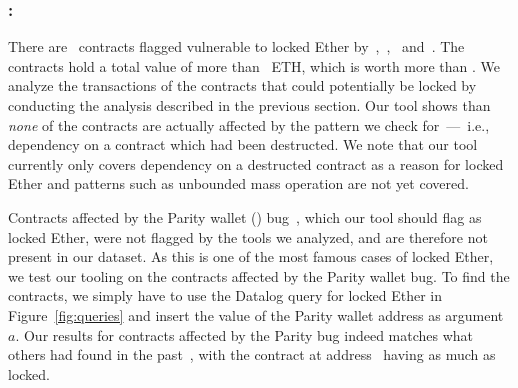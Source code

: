% 

\subsubsection{\vle: \lockedether}
\label{ssec:analysis-le}
There are~ contracts flagged vulnerable to locked Ether by~\cite{Tsankov2018},~\cite{Grech2018},~\cite{Nikolic2018a} and~\cite{DBLP:conf/ndss/KalraGDS18}. The contracts hold a total value of more than~ ETH, which is worth more than . We analyze the transactions of the contracts that could potentially be locked by conducting the analysis described in the previous section. Our tool shows than \emph{none} of the contracts are actually affected by the pattern we check for~---~i.e., dependency on a contract which had been destructed.
We note that our tool currently only covers dependency on a destructed contract as a reason for locked Ether and patterns such as unbounded mass operation are not yet covered.

Contracts affected by the Parity wallet () bug~\cite{Breidenbach}, which our tool should flag as locked Ether, were not flagged by the tools we analyzed, and are therefore not present in our dataset.
As this is one of the most famous cases of locked Ether, we test our tooling on the contracts affected by the Parity wallet bug.
To find the contracts, we simply have to use the Datalog query for locked Ether in Figure~\ref{fig:queries} and insert the value of the Parity wallet address as argument $a$. Our results for contracts affected by the Parity bug indeed matches what others had found in the past~\cite{parity-wallet-freeze}, with the contract at address~ having as much as  locked.




